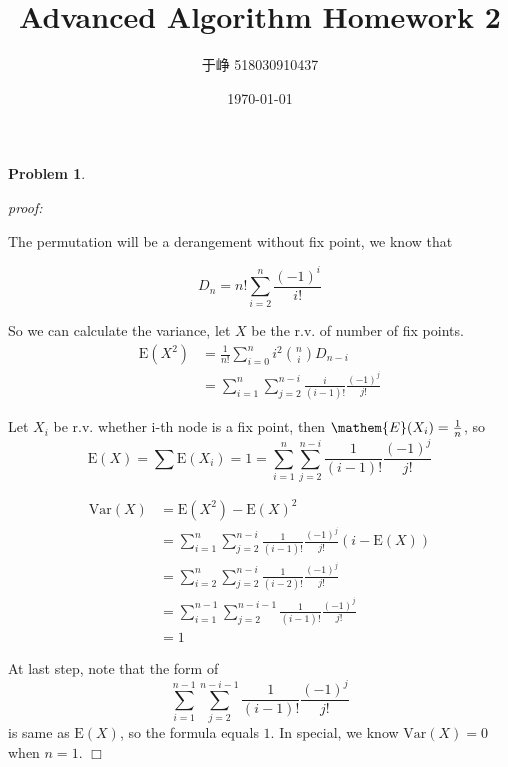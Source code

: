 \documentclass{article}
\title{Advanced Algorithm Homework 2}
\author{于峥 518030910437}
\date{\today}
\newtheorem{problem}[theorem]{Problem}
\newenvironment{solution}{\noindent \textit{proof:}}{$\Box$}
\begin{document}
    \maketitle
    
\begin{problem}
\end{problem}
\begin{solution}
    
    The permutation will be a derangement without fix point, we know that
    
    $$
    D_n = n! \sum_{i=2}^n\frac {(-1)^i} {i!}
    $$
    
    So we can calculate the variance, let $X$ be the r.v. of number of fix points.
    \begin{align*}
        \mathrm{E}(X^2) 
        &= \frac 1 {n!} \sum_{i=0}^n i^2 \binom{n}{i}D_{n-i} \\
        &= \sum_{i=1}^n \sum_{j=2}^{n-i} \frac i {(i-1)!} \frac {(-1)^j} {j!} 
    \end{align*}
    
    Let $X_i$ be r.v. whether i-th node is a fix point, then $\mathem{E}(X_i) = \frac 1 n$, so
    $$
    \mathrm{E}(X) = \sum \mathrm{E}(X_i)= 1  = \sum_{i=1}^n \sum_{j=2}^{n-i} \frac 1 {(i-1)!} \frac {(-1)^j} {j!}
    $$
    
    \begin{align*}
        \mathrm{Var}(X) 
        &= \mathrm{E}(X^2) - \mathrm{E}(X)^2 \\
        &= \sum_{i=1}^n \sum_{j=2}^{n-i} \frac 1 {(i-1)!} \frac {(-1)^j} {j!} (i-\mathrm{E}(X)) \\
        &= \sum_{i=2}^n \sum_{j=2}^{n-i} \frac 1 {(i-2)!} \frac {(-1)^j} {j!} \\
        &= \sum_{i=1}^{n-1} \sum_{j=2}^{n-i-1} \frac 1 {(i-1)!} \frac {(-1)^j} {j!} \\
        &= 1
    \end{align*}
    
    At last step, note that the form of
    $$
        \sum_{i=1}^{n-1} \sum_{j=2}^{n-i-1} \frac 1 {(i-1)!} \frac {(-1)^j} {j!}
    $$
    is same as $\mathrm{E}(X)$, so the formula equals $1$. In special, we know $\mathrm{Var}(X)=0$ when $n=1$.
\end{solution}
\end{document}
